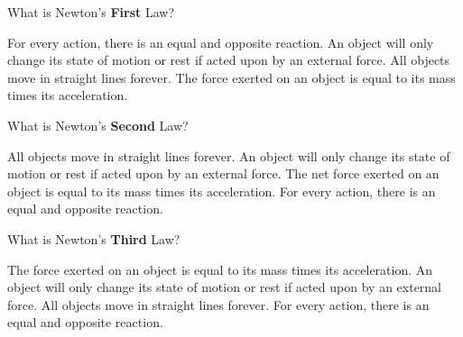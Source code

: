 \begin{questions}
\begin{parts}
\qsp 

\begin{centering}
\end{centering}

\qsp

\end{parts}

\newpage
{}


\question[1] What is Newton's \textbf{First} Law? 

\begin{choices}
\choice For every action, there is an equal and opposite reaction. 
\choice An object will only change its state of motion or rest if acted upon by an external force.
\choice All objects move in straight lines forever.
\choice The force exerted on an object is equal to its mass times its acceleration.
\end{choices}

\qsp

\question[1] What is Newton's \textbf{Second} Law? 

\begin{choices}
\choice All objects move in straight lines forever.
\choice An object will only change its state of motion or rest if acted upon by an external force.
\choice The net force exerted on an object is equal to its mass times its acceleration.
\choice For every action, there is an equal and opposite reaction.
\end{choices}

\qsp

\question[1] What is Newton's \textbf{Third} Law? 

\begin{choices}
\choice The force exerted on an object is equal to its mass times its acceleration.
\choice An object will only change its state of motion or rest if acted upon by an external force.
\choice All objects move in straight lines forever.
\choice For every action, there is an equal and opposite reaction.
\end{choices}


\end{questions}

